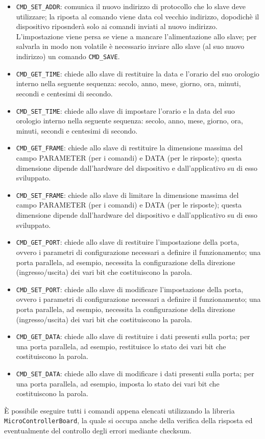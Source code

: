 \begin{itemize}
\item \texttt{CMD\_SET\_ADDR}: comunica il nuovo indirizzo di protocollo che lo slave deve utilizzare; la riposta al comando
viene data col vecchio indirizzo, dopodich\`e il dispositivo riposnder\`a solo ai comandi inviati al nuovo indirizzo. 
L'impostazione viene persa se viene a mancare l'alimentazione allo slave; per salvarla in modo non volatile \`e 
necessario inviare allo slave (al suo nuovo indirizzo) un comando \texttt{CMD\_SAVE}.
\item \texttt{CMD\_GET\_TIME}: chiede allo slave di restituire la data e l'orario del suo orologio interno nella seguente
sequenza: secolo, anno, mese, giorno, ora, minuti, secondi e centesimi di secondo.
\item \texttt{CMD\_SET\_TIME}: chiede allo slave di impostare l'orario e la data del suo orologio interno nella seguente
sequenza: secolo, anno, mese, giorno, ora, minuti, secondi e centesimi di secondo.
\item \texttt{CMD\_GET\_FRAME}: chiede allo slave di restituire la dimensione massima del campo PARAMETER (per i comandi)
e DATA (per le risposte); questa dimensione dipende dall'hardware del dispositivo e dall'applicativo su di esso
sviluppato.
\item \texttt{CMD\_SET\_FRAME}: chiede allo slave di limitare la dimensione massima del campo PARAMETER (per i comandi)
e DATA (per le risposte); questa dimensione dipende dall'hardware del dispositivo e dall'applicativo su di esso sviluppato.
\item \texttt{CMD\_GET\_PORT}: chiede allo slave di restituire l'impostazione della porta, ovvero i parametri di configurazione
necessari a definire il funzionamento; una porta parallela, ad esempio, necessita la configurazione della direzione 
(ingresso/uscita) dei vari bit che costituiscono la parola.
\item \texttt{CMD\_SET\_PORT}: chiede allo slave di modificare l'impostazione della porta, ovvero i parametri di configurazione
necessari a definire il funzionamento; una porta parallela, ad esempio, necessita la configurazione della direzione 
(ingresso/uscita) dei vari bit che costituiscono la parola.
\item \texttt{CMD\_GET\_DATA}: chiede allo slave di restituire i dati presenti sulla porta; per una porta parallela, ad esempio,
restituisce lo stato dei vari bit che costituiscono la parola.
\item \texttt{CMD\_SET\_DATA}:  chiede allo slave di modificare i dati presenti sulla porta; per una porta parallela, ad esempio,
imposta lo stato dei vari bit che costituiscono la parola.
\end{itemize}
\`E possibile eseguire tutti i comandi appena elencati utilizzando la libreria \texttt{MicroControllerBoard}, la quale si occupa
anche della verifica della risposta ed eventualmente del controllo degli errori mediante checksum.

